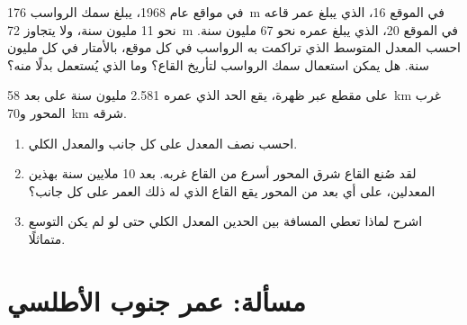 \begin{exercise}[$\star\star\star$]\label{exo:g11:drift-to-spreading:14}
في مواقع عام 1968، يبلغ سمك الرواسب \qty{176}{m} في الموقع 16، الذي يبلغ عمر قاعه
نحو \num{11} مليون سنة، ولا يتجاوز \qty{72}{m} في الموقع 20، الذي يبلغ عمره
نحو \num{67} مليون سنة. احسب المعدل المتوسط الذي
تراكمت به الرواسب في كل موقع، بالأمتار في كل مليون سنة. هل يمكن استعمال سمك
الرواسب لتأريخ القاع؟ وما الذي يُستعمل بدلًا منه؟
\end{exercise}

\begin{exercise}[$\star\star\star$]\label{exo:g11:drift-to-spreading:15}
على مقطع عبر ظهرة، يقع الحد الذي عمره \num{2.581} مليون سنة على بعد
\qty{58}{km} غرب المحور و\qty{70}{km} شرقه.
\begin{enumerate}
  \item احسب نصف المعدل على كل جانب والمعدل الكلي.
  \item لقد صُنع القاع شرق المحور أسرع من القاع غربه.
        بعد 10 ملايين سنة بهذين المعدلين، على أي بعد من المحور
        يقع القاع الذي له ذلك العمر على كل جانب؟
  \item اشرح لماذا تعطي المسافة بين الحدين المعدل
        الكلي حتى لو لم يكن التوسع متماثلًا.
\end{enumerate}
\end{exercise}

\section{مسألة: عمر جنوب الأطلسي}

